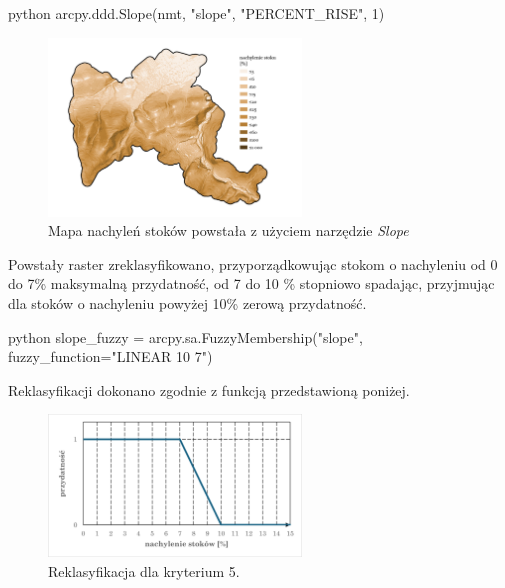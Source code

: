 \documentclass{article}
\begin{document}
\begin{mintedbox}{python}
arcpy.ddd.Slope(nmt, "slope", "PERCENT_RISE", 1)
\end{mintedbox}
\vspace{10pt}

\begin{figure}[H]
    \centering
    \includegraphics[width=0.6\textwidth]{img/kryterium5-stoki.jpg}
    \caption{Mapa nachyleń stoków powstała z użyciem narzędzie \textit{Slope}}
\end{figure}

Powstały raster zreklasyfikowano, przyporządkowując stokom o nachyleniu od 0 do 7\% maksymalną przydatność, od 7 do 10 \% stopniowo spadając, przyjmując dla stoków o nachyleniu powyżej 10\% zerową przydatność.
\vspace{5pt}

\begin{mintedbox}{python}
slope_fuzzy = arcpy.sa.FuzzyMembership("slope", fuzzy_function="LINEAR 10 7")
\end{mintedbox}
\vspace{10pt}

Reklasyfikacji dokonano zgodnie z funkcją przedstawioną poniżej.
\vspace{5pt}

\begin{figure}[H]
    \centering
    \includegraphics[width=0.6\textwidth]{img/kryterium5-wykres-glowny.png}
    \caption{Reklasyfikacja dla kryterium 5.}
\end{figure}
\vspace{10pt}
\end{document}
